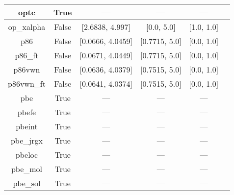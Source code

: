 \begin{tabular}{|c|c|c|c|c|l|}
          optc &                  True &              --- &              --- &              --- &                                           \cite{Cohen2001_607} \\ \hline
    op\_xalpha &                 False &  [2.6838, 4.997] &       [0.0, 5.0] &       [1.0, 1.0] &                      \cite{Tsuneda1999_10664,Tsuneda1999_5656} \\ \hline
           p86 &                 False & [0.0666, 4.0459] &    [0.7715, 5.0] &       [0.0, 1.0] &                                         \cite{Perdew1986_8822} \\ \hline
       p86\_ft &                 False & [0.0671, 4.0449] &    [0.7715, 5.0] &       [0.0, 1.0] &                                         \cite{Perdew1986_8822} \\ \hline
        p86vwn &                 False & [0.0636, 4.0379] &    [0.7515, 5.0] &       [0.0, 1.0] &                                         \cite{Perdew1986_8822} \\ \hline
    p86vwn\_ft &                 False & [0.0641, 4.0374] &    [0.7515, 5.0] &       [0.0, 1.0] &                                         \cite{Perdew1986_8822} \\ \hline
           pbe &                  True &              --- &              --- &              --- &                     \cite{Perdew1996_3865,Perdew1996_3865_err} \\ \hline
         pbefe &                  True &              --- &              --- &              --- &                                          \cite{Perez2015_3844} \\ \hline
        pbeint &                  True &              --- &              --- &              --- &                                      \cite{Fabiano2010_113104} \\ \hline
     pbe\_jrgx &                  True &              --- &              --- &              --- &                                      \cite{Pedroza2009_201106} \\ \hline
        pbeloc &                  True &              --- &              --- &              --- &                                   \cite{Constantin2012_035130} \\ \hline
      pbe\_mol &                  True &              --- &              --- &              --- &                                     \cite{delCampo2012_104108} \\ \hline
      pbe\_sol &                  True &              --- &              --- &              --- &                                       \cite{Perdew2008_136406} \\ \hline

\end{tabular}
